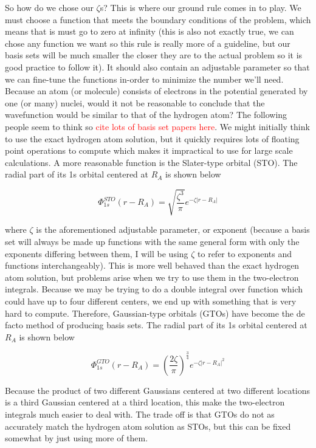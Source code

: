 \documentclass[12pt]{report}
\newcommand{\notetodylan}[1]{\textcolor{red}{#1}} %
\begin{document}
So how do we chose our $\zeta$s? This is where our ground rule comes in to play. We must choose a function that meets the boundary conditions of the problem, which means that is must go to zero at infinity (this is also not exactly true, we can chose any function we want so this rule is really more of a guideline, but our basis sets will be much smaller the closer they are to the actual problem so it is good practice to follow it). It should also contain an adjustable parameter so that we can fine-tune the functions in-order to minimize the number we'll need. Because an atom (or molecule) consists of electrons in the potential generated by one (or many) nuclei, would it not be reasonable to conclude that the wavefunction would be similar to that of the hydrogen atom? The following people seem to think so \notetodylan{cite lots of basis set papers here}. We might initially think to use the exact hydrogen atom solution, but it quickly requires lots of floating point operations to compute which makes it impractical to use for large scale calculations. A more reasonable function is the Slater-type orbital (STO). The radial part of its 1s orbital centered at $R_{A}$ is shown below

\begin{equation}
\label{eq:sto_1s}
\Phi^{STO}_{1s}(r - R_{A}) = \sqrt{\frac{\zeta^{3}}{\pi}}e^{-\zeta|r- R_{A}|}
\end{equation}

where $\zeta$ is the aforementioned adjustable parameter, or exponent (because a basis set will always be made up functions with the same general form with only the exponents differing between them, I will be using $\zeta$ to refer to exponents and functions interchangeably). This is more well behaved than the exact hydrogen atom solution, but problems arise when we try to use them in the two-electron integrals. Because we may be trying to do a double integral over function which could have up to four different centers, we end up with something that is very hard to compute. Therefore, Gaussian-type orbitals (GTOs) have become the de facto method of producing basis sets. The radial part of its 1s orbital centered at $R_{A}$ is shown below

\begin{equation}
\label{eq:gto_1s}
\Phi^{GTO}_{1s}(r - R_{A}) = \left(\frac{2\zeta}{\pi}\right)^{\frac{3}{4}}e^{-\zeta|r- R_{A}|^{2}}
\end{equation}

Because the product of two different Gaussians centered at two different locations is a third Gaussian centered at a third location, this make the two-electron integrals much easier to deal with. The trade off is that GTOs do not as accurately match the hydrogen atom solution as STOs, but this can be fixed somewhat by just using more of them.
\end{document}
